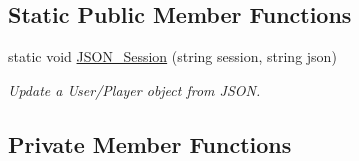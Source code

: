 \subsection*{Static Public Member Functions}
\begin{DoxyCompactItemize}
\item 
static void \mbox{\hyperlink{class_update_sessions_a841ee986ab762d64af283c9ba009c23d}{J\+S\+O\+N\+\_\+\+Session}} (string session, string json)
\begin{DoxyCompactList}\small\item\em Update a User/\+Player object from J\+S\+ON. \end{DoxyCompactList}\end{DoxyCompactItemize}
\subsection*{Private Member Functions}
